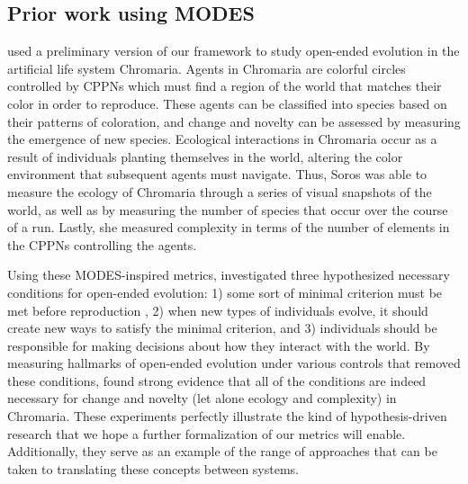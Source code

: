 \documentclass[letterpaper]{article}
\begin{document}

\subsection{Prior work using MODES}


\cite{soros_necessary_2018} used a preliminary version of our framework \citep{blogpost} to study open-ended evolution in the artificial life system Chromaria. Agents in Chromaria are colorful circles controlled by CPPNs which must find a region of the world that matches their color in order to reproduce. These agents can be classified into species based on their patterns of coloration, and change and novelty can be assessed by measuring the emergence of new species. Ecological interactions in Chromaria occur as a result of individuals planting themselves in the world, altering the color environment that subsequent agents must navigate. Thus, Soros was able to measure the ecology of Chromaria through a series of visual snapshots of the world, as well as by measuring the number of species that occur over the course of a run. Lastly, she measured complexity in terms of the number of elements in the CPPNs controlling the agents. 

Using these MODES-inspired metrics, \cite{soros_necessary_2018} investigated three hypothesized necessary conditions for open-ended evolution: 1) some sort of minimal criterion must be met before reproduction \citep{soros_identifying_2014}, 2) when new types of individuals evolve, it should create new ways to satisfy the minimal criterion, and 3) individuals should be responsible for making decisions about how they interact with the world. By measuring hallmarks of open-ended evolution under various controls that removed these conditions, \cite{soros_necessary_2018} found strong evidence that all of the conditions are indeed necessary for change and novelty (let alone ecology and complexity) in Chromaria. These experiments perfectly illustrate the kind of hypothesis-driven research that we hope a further formalization of our metrics will enable. Additionally, they serve as an example of the range of approaches that can be taken to translating these concepts between systems. 
\end{document}
